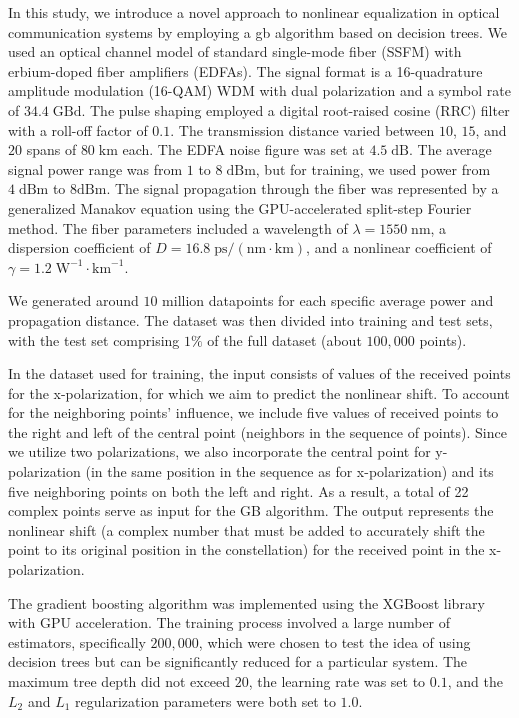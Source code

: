 In this study, we introduce a novel approach to nonlinear equalization in optical communication systems by employing a \acrshort{gb} algorithm based on decision trees.
We used an optical channel model of standard single-mode fiber (SSFM) with erbium-doped fiber amplifiers (EDFAs). The signal format is a 16-quadrature amplitude modulation (16-QAM) WDM with dual polarization and a symbol rate of $34.4\;\textrm{GBd}$. The pulse shaping employed a digital root-raised cosine (RRC) filter with a roll-off factor of $0.1$. The transmission distance varied between $10$, $15$, and $20$ spans of $80\;\textrm{km}$ each. The EDFA noise figure was set at $4.5\;\textrm{dB}$. The average signal power range was from $1$ to $8\;\textrm{dBm}$, but for training, we used power from $4\;\textrm{dBm}$ to $8 \textrm{dBm}$. The signal propagation through the fiber was represented by a generalized Manakov equation using the GPU-accelerated split-step Fourier method\cite{esf0_2023_7880552}. The fiber parameters included a wavelength of $\lambda = 1550\;\textrm{nm}$, a dispersion coefficient of $D = 16.8\;\textrm{ps}/(\textrm{nm} \cdot \textrm{km})$, and a nonlinear coefficient of $\gamma = 1.2\;\textrm{W}^{-1} \cdot \textrm{km}^{-1}$.

We generated around $10$ million datapoints for each specific average power and propagation distance. The dataset was then divided into training and test sets, with the test set comprising $1\%$ of the full dataset (about $100,000$ points).

In the dataset used for training, the input consists of values of the received points for the x-polarization, for which we aim to predict the nonlinear shift. To account for the neighboring points' influence, we include five values of received points to the right and left of the central point (neighbors in the sequence of points). Since we utilize two polarizations, we also incorporate the central point for y-polarization (in the same position in the sequence as for x-polarization) and its five neighboring points on both the left and right. As a result, a total of 22 complex points serve as input for the GB algorithm. The output represents the nonlinear shift (a complex number that must be added to accurately shift the point to its original position in the constellation) for the received point in the x-polarization.

The gradient boosting algorithm was implemented using the XGBoost library\cite{Chen:2016:XST:2939672.2939785} with GPU acceleration. The training process involved a large number of estimators, specifically $200,000$, which were chosen to test the idea of using decision trees but can be significantly reduced for a particular system. The maximum tree depth did not exceed $20$, the learning rate was set to $0.1$, and the $L_2$ and $L_1$ regularization parameters were both set to $1.0$.

